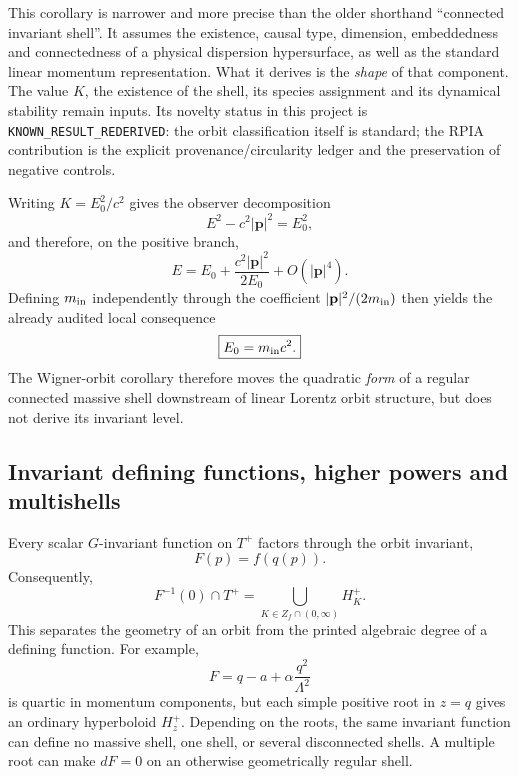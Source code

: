 \documentclass[11pt,a4paper]{article}
\begin{document}
This corollary is narrower and more precise than the older shorthand ``connected invariant shell''.  It assumes the existence, causal type, dimension, embeddedness and connectedness of a physical dispersion hypersurface, as well as the standard linear momentum representation.  What it derives is the \emph{shape} of that component.  The value $K$, the existence of the shell, its species assignment and its dynamical stability remain inputs.  Its novelty status in this project is \texttt{KNOWN\_RESULT\_REDERIVED}: the orbit classification itself is standard; the RPIA contribution is the explicit provenance/circularity ledger and the preservation of negative controls.

Writing $K=E_0^2/c^2$ gives the observer decomposition
\begin{equation}
 E^2-c^2|\mathbf p|^2=E_0^2,
\end{equation}
and therefore, on the positive branch,
\begin{equation}
 E=E_0+\frac{c^2|\mathbf p|^2}{2E_0}+O(|\mathbf p|^4).
\end{equation}
Defining $m_{\rm in}$ independently through the coefficient $|\mathbf p|^2/(2m_{\rm in})$ then yields the already audited local consequence
\begin{equation}
 \boxed{E_0=m_{\rm in}c^2.}
\end{equation}
The Wigner-orbit corollary therefore moves the quadratic \emph{form} of a regular connected massive shell downstream of linear Lorentz orbit structure, but does not derive its invariant level.

\subsection{Invariant defining functions, higher powers and multishells}
Every scalar $G$-invariant function on $T^+$ factors through the orbit invariant,
\begin{equation}
 F(p)=f(q(p)).
\end{equation}
Consequently,
\begin{equation}
 F^{-1}(0)\cap T^+=\bigcup_{K\in Z_f\cap(0,\infty)}H_K^+.
\end{equation}
This separates the geometry of an orbit from the printed algebraic degree of a defining function.  For example,
\begin{equation}
 F=q-a+\alpha\frac{q^2}{\Lambda^2}
\end{equation}
is quartic in momentum components, but each simple positive root in $z=q$ gives an ordinary hyperboloid $H_z^+$.  Depending on the roots, the same invariant function can define no massive shell, one shell, or several disconnected shells.  A multiple root can make $dF=0$ on an otherwise geometrically regular shell.
\end{document}
